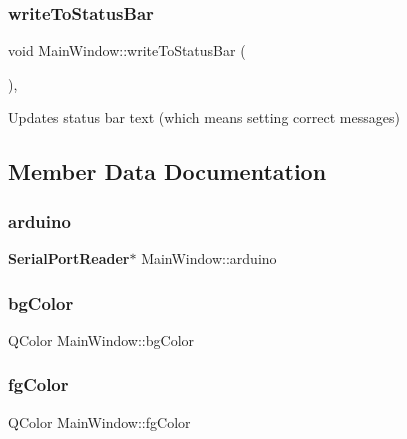 \subsubsection{write\+To\+Status\+Bar}
{\footnotesize\ttfamily void Main\+Window\+::write\+To\+Status\+Bar (\begin{DoxyParamCaption}{ }\end{DoxyParamCaption})\hspace{0.3cm}{\ttfamily [private]}, {\ttfamily [slot]}}



Updates status bar text (which means setting correct messages) 



\subsection{Member Data Documentation}
\mbox{\label{class_main_window_aba5a40e0587b38a584b92583600373f6}} 
\subsubsection{arduino}
{\footnotesize\ttfamily \textbf{ Serial\+Port\+Reader}$\ast$ Main\+Window\+::arduino\hspace{0.3cm}{\ttfamily [private]}}

\mbox{\label{class_main_window_a4a1005daadc7447af6907c57b54e41ab}} 
\subsubsection{bg\+Color}
{\footnotesize\ttfamily Q\+Color Main\+Window\+::bg\+Color\hspace{0.3cm}{\ttfamily [private]}}

\mbox{\label{class_main_window_a1f5455abfb51d7c4733bfad76ac60606}} 
\subsubsection{fg\+Color}
{\footnotesize\ttfamily Q\+Color Main\+Window\+::fg\+Color\hspace{0.3cm}{\ttfamily [private]}}

\mbox{\label{class_main_window_a9243762b319de95b998df3e36934d6ef}} 
